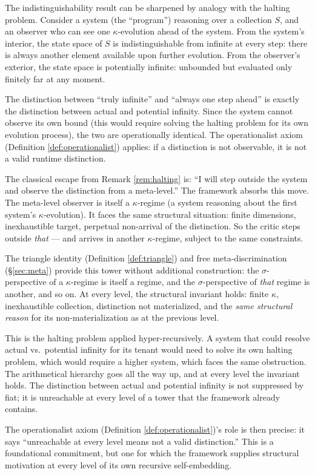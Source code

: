 \begin{remark}
\label{rem:halting}
The indistinguishability result can be sharpened by analogy
with the halting problem. Consider a system (the ``program'')
reasoning over a collection $S$, and an observer who can see
one $\kappa$-evolution ahead of the system. From the system's
interior, the state space of $S$ is indistinguishable from
infinite at every step: there is always another element
available upon further evolution. From the observer's
exterior, the state space is potentially infinite: unbounded
but evaluated only finitely far at any moment.

The distinction between ``truly infinite'' and ``always
one step ahead'' is exactly the distinction between actual
and potential infinity. Since the system cannot observe its
own bound (this would require solving the halting problem
for its own evolution process), the two are operationally
identical. The operationalist axiom
(Definition \ref{def:operationalist}) applies:
if a distinction is not observable, it is not a valid
runtime distinction.
\end{remark}

\begin{remark}
\label{rem:hyper-recursive}
The classical escape from Remark \ref{rem:halting} is:
``I will step outside the system and observe the
distinction from a meta-level.'' The framework absorbs
this move. The meta-level observer is itself a
$\kappa$-regime (a system reasoning about the first
system's $\kappa$-evolution). It faces the same
structural situation: finite dimensions, inexhaustible
target, perpetual non-arrival of the distinction. So
the critic steps outside \emph{that} --- and arrives in
another $\kappa$-regime, subject to the same constraints.

The triangle identity (Definition \ref{def:triangle})
and free meta-discrimination (\S\ref{sec:meta}) provide
this tower without additional construction: the
$\sigma$-perspective of a $\kappa$-regime is itself a
regime, and the $\sigma$-perspective of \emph{that}
regime is another, and so on. At every level, the
structural invariant holds: finite $\kappa$, inexhaustible
collection, distinction not materialized, and the
\emph{same structural reason} for its non-materialization
as at the previous level.

This is the halting problem applied hyper-recursively.
A system that could resolve actual vs.\ potential
infinity for its tenant would need to solve its own
halting problem, which would require a higher system,
which faces the same obstruction. The arithmetical
hierarchy goes all the way up, and at every level the
invariant holds. The distinction between actual and
potential infinity is not suppressed by fiat; it is
unreachable at every level of a tower that the framework
already contains.

The operationalist axiom (Definition \ref{def:operationalist})'s role is then precise: it says
``unreachable at every level means not a valid
distinction.'' This is a foundational commitment, but
one for which the framework supplies structural
motivation at every level of its own recursive
self-embedding.
\end{remark}

